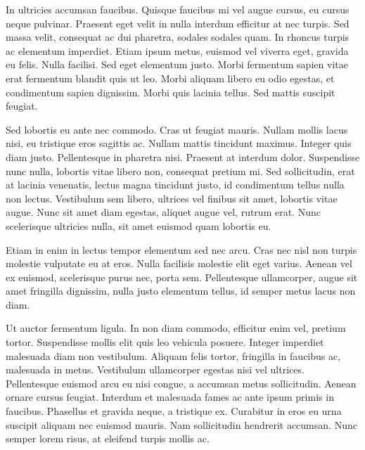 \documentclass[10pt, a4paper]{article}
\theoremstyle{theorem-style}
\theoremstyle{definition-style}
\theoremstyle{remark-style}
\theoremstyle{example-style}
\theoremstyle{definition-style}
\theoremstyle{remark-style}
\begin{document}
In ultricies accumsan faucibus. Quisque faucibus mi vel augue cursus, eu cursus neque pulvinar. Praesent eget velit in nulla interdum efficitur at nec turpis. Sed massa velit\footnotemark, consequat ac dui pharetra, sodales sodales quam. In rhoncus turpis ac elementum imperdiet. Etiam ipsum metus, euismod vel viverra eget, gravida eu felis. Nulla facilisi. Sed eget elementum justo. Morbi fermentum sapien vitae erat fermentum blandit quis ut leo. Morbi aliquam libero eu odio egestas, et condimentum sapien dignissim. Morbi quis lacinia tellus. Sed mattis suscipit feugiat.





Sed lobortis eu ante nec commodo. Cras ut feugiat mauris. Nullam mollis lacus nisi, eu tristique eros sagittis ac. Nullam mattis tincidunt maximus. Integer quis diam justo. Pellentesque in pharetra nisi. Praesent at interdum dolor. Suspendisse nunc nulla, lobortis vitae libero non, consequat pretium mi. Sed sollicitudin, erat at lacinia venenatis, lectus magna tincidunt justo, id condimentum tellus nulla non lectus. Vestibulum sem libero, ultrices vel finibus sit amet, lobortis vitae augue. Nunc sit amet diam egestas, aliquet augue vel, rutrum erat. Nunc scelerisque ultricies nulla, sit amet euismod quam lobortis eu.

Etiam in enim in lectus tempor elementum sed nec arcu. Cras nec nisl non turpis molestie vulputate eu at eros. Nulla facilisis molestie elit eget varius. Aenean vel ex euismod, scelerisque purus nec, porta sem. Pellentesque ullamcorper, augue sit amet fringilla dignissim, nulla justo elementum tellus, id semper metus lacus non diam.

Ut auctor fermentum ligula. In non diam commodo, efficitur enim vel, pretium tortor. Suspendisse mollis elit quis leo vehicula posuere. Integer imperdiet malesuada diam non vestibulum. Aliquam felis tortor, fringilla in faucibus ac, malesuada in metus. Vestibulum ullamcorper egestas nisi vel ultrices. Pellentesque euismod arcu eu nisi congue, a accumsan metus sollicitudin. Aenean ornare cursus feugiat. Interdum et malesuada fames ac ante ipsum primis in faucibus. Phasellus et gravida neque, a tristique ex. Curabitur in eros eu urna suscipit aliquam nec euismod mauris. Nam sollicitudin hendrerit accumsan. Nunc semper lorem risus, at eleifend turpis mollis ac.
\end{document}
